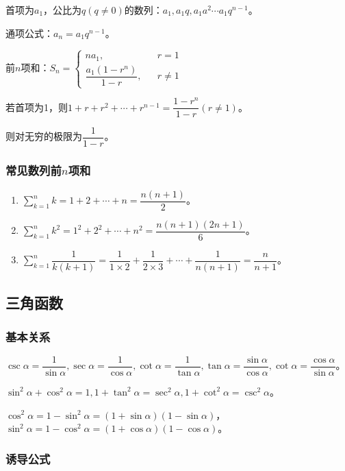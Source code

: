 首项为$a_1$，公比为$q(q\neq 0)$的数列：$a_1,a_1q,a_1a^2\cdots a_1q^{n-1}$。

通项公式：$a_n=a_1q^{n-1}$。

前$n$项和：$S_n=
    \left\{
    \begin{array}{lcl}
        na_1,                   &  & r=1     \\
        \dfrac{a_1(1-r^n)}{1-r}, &  & r\neq 1
    \end{array}
    \right.$

若首项为1，则$1+r+r^2+\cdots+r^{n-1}=\dfrac{1-r^n}{1-r}(r\neq 1)$。

则对无穷的极限为$\dfrac{1}{1-r}$。

\subsubsection{常见数列前\texorpdfstring{$n$}n项和}

\begin{enumerate}
    \item $\sum_{k=1}^nk=1+2+\cdots+n=\dfrac{n(n+1)}{2}$。
    \item $\sum_{k=1}^nk^2=1^2+2^2+\cdots+n^2=\dfrac{n(n+1)(2n+1)}{6}$。
    \item $\sum_{k=1}^n\dfrac{1}{k(k+1)}=\dfrac{1}{1\times 2}+\dfrac{1}{2\times 3}+\cdots+\dfrac{1}{n(n+1)}=\dfrac{n}{n+1}$。
\end{enumerate}

\subsection{三角函数}

\subsubsection{基本关系}

$\csc\alpha=\dfrac{1}{\sin\alpha},\sec\alpha=\dfrac{1}{\cos\alpha},\cot\alpha=\dfrac{1}{\tan\alpha},\tan\alpha=\dfrac{\sin\alpha}{\cos\alpha},\cot\alpha=\dfrac{\cos\alpha}{\sin\alpha}$。

$\sin^2\alpha+\cos^2\alpha=1,1+\tan^2\alpha=\sec^2\alpha,1+\cot^2\alpha=\csc^2\alpha$。

$\cos^2\alpha=1-\sin^2\alpha=(1+\sin\alpha)(1-\sin\alpha)$，$\sin^2\alpha=1-\cos^2\alpha=(1+\cos\alpha)(1-\cos\alpha)$。

\subsubsection{诱导公式}

